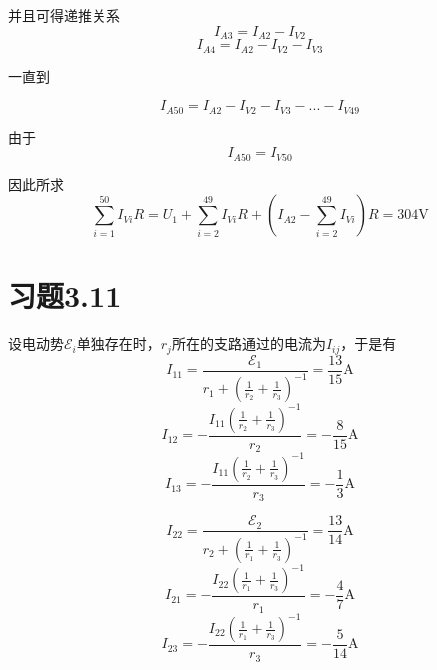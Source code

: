 \documentclass{SCIS2020cn}
\begin{document}
并且可得递推关系
\begin{equation}
    I_{A3}=I_{A2}-I_{V2}
\end{equation}
\begin{equation}
    I_{A4}=I_{A2}-I_{V2}-I_{V3}
\end{equation}

一直到

\begin{equation}
    I_{A50}=I_{A2}-I_{V2}-I_{V3}-...-I_{V49}
\end{equation}

由于
\begin{equation}
    I_{A50}=I_{V50}
\end{equation}

因此所求
\begin{equation}
    \sum_{i=1}^{50}{I_{Vi}R}=U_1+\sum_{i=2}^{49}I_{Vi}R+\left(I_{A2}-\sum_{i=2}^{49}I_{Vi}\right)R=304\text{V}
\end{equation}

\section{习题3.11}
设电动势$\mathscr{E}_i$单独存在时，$r_j$所在的支路通过的电流为$I_{ij}$，于是有
\begin{equation}
    I_{11}=\frac{\mathscr{E}_1}{r_1+\left(\frac{1}{r_2}+\frac{1}{r_3}\right)^{-1}}=\frac{13}{15}\text{A}
\end{equation}
\begin{equation}
    I_{12}=-\frac{I_{11}\left(\frac{1}{r_2}+\frac{1}{r_3}\right)^{-1}}{r_2}=-\frac{8}{15}\text{A}
\end{equation}
\begin{equation}
    I_{13}=-\frac{I_{11}\left(\frac{1}{r_2}+\frac{1}{r_3}\right)^{-1}}{r_3}=-\frac{1}{3}\text{A}
\end{equation}

\begin{equation}
    I_{22}=\frac{\mathscr{E}_2}{r_2+\left(\frac{1}{r_1}+\frac{1}{r_3}\right)^{-1}}=\frac{13}{14}\text{A}
\end{equation}
\begin{equation}
    I_{21}=-\frac{I_{22}\left(\frac{1}{r_1}+\frac{1}{r_3}\right)^{-1}}{r_1}=-\frac{4}{7}\text{A}
\end{equation}
\begin{equation}
    I_{23}=-\frac{I_{22}\left(\frac{1}{r_1}+\frac{1}{r_3}\right)^{-1}}{r_3}=-\frac{5}{14}\text{A}
\end{equation}
\end{document}
